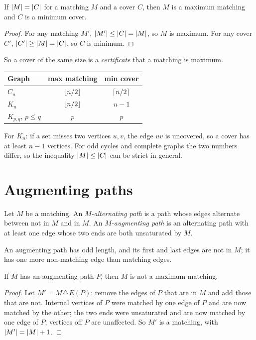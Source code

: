 \begin{corollary}
If $\left\lvert M \right\rvert = \left\lvert C \right\rvert$ for a matching $M$ and a cover $C$, then $M$ is a maximum matching and $C$
is a minimum cover.
\end{corollary}
\begin{proof}
For any matching $M'$, $\left\lvert M' \right\rvert \le \left\lvert C \right\rvert = \left\lvert M \right\rvert$, so $M$ is maximum. For any cover $C'$,
$\left\lvert C' \right\rvert \ge \left\lvert M \right\rvert = \left\lvert C \right\rvert$, so $C$ is minimum.
\end{proof}

So a cover of the same size is a \emph{certificate} that a matching is maximum.

\begin{example}
\begin{center}
\begin{tabular}{lcc}
\toprule
Graph & max matching & min cover\\
\midrule
$C_n$ & $\left\lfloor n/2 \right\rfloor$ & $\left\lceil n/2 \right\rceil$\\
$K_n$ & $\left\lfloor n/2 \right\rfloor$ & $n - 1$\\
$K_{p,q}$, $p \le q$ & $p$ & $p$\\
\bottomrule
\end{tabular}
\end{center}
For $K_n$: if a set misses two vertices $u, v$, the edge $uv$ is uncovered, so a cover has at
least $n - 1$ vertices. For odd cycles and complete graphs the two numbers differ, so the
inequality $\left\lvert M \right\rvert\le\left\lvert C \right\rvert$ can be strict in general.
\end{example}

\section{Augmenting paths}

\begin{definition}
Let $M$ be a matching. An \emph{$M$-alternating path} is a path whose edges alternate between
not in $M$ and in $M$. An \emph{$M$-augmenting path} is an alternating path with at least one edge
whose two ends are both unsaturated by $M$.
\end{definition}

An augmenting path has odd length, and its first and last edges are not in $M$; it has one more
non-matching edge than matching edges.

\begin{lemma}
If $M$ has an augmenting path $P$, then $M$ is not a maximum matching.
\end{lemma}
\begin{proof}
Let $M' = M \triangle E(P)$: remove the edges of $P$ that are in $M$ and add those that are not.
Internal vertices of $P$ were matched by one edge of $P$ and are now matched by the other; the two
ends were unsaturated and are now matched by one edge of $P$; vertices off $P$ are unaffected. So
$M'$ is a matching, with $\left\lvert M' \right\rvert = \left\lvert M \right\rvert + 1$.
\end{proof}

